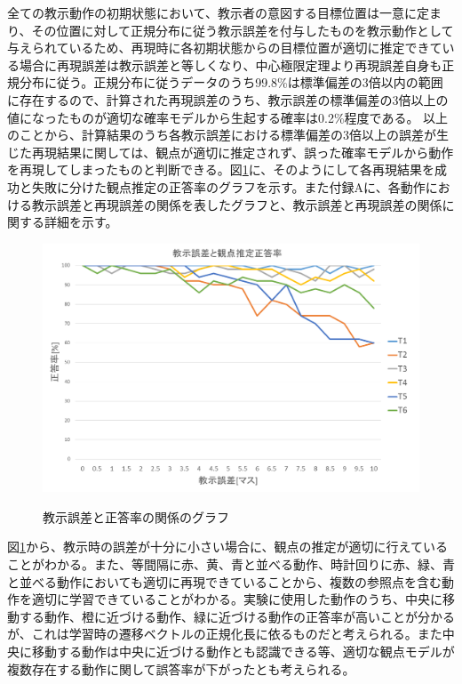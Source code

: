 全ての教示動作の初期状態において、教示者の意図する目標位置は一意に定まり、その位置に対して正規分布に従う教示誤差を付与したものを教示動作として与えられているため、再現時に各初期状態からの目標位置が適切に推定できている場合に再現誤差は教示誤差と等しくなり、中心極限定理より再現誤差自身も正規分布に従う。正規分布に従うデータのうち99.8\%は標準偏差の3倍以内の範囲に存在するので、計算された再現誤差のうち、教示誤差の標準偏差の3倍以上の値になったものが適切な確率モデルから生起する確率は0.2\%程度である。
以上のことから、計算結果のうち各教示誤差における標準偏差の3倍以上の誤差が生じた再現結果に関しては、観点が適切に推定されず、誤った確率モデルから動作を再現してしまったものと判断できる。図\ref{figure:success_rate}に、そのようにして各再現結果を成功と失敗に分けた観点推定の正答率のグラフを示す。また付録Aに、各動作における教示誤差と再現誤差の関係を表したグラフと、教示誤差と再現誤差の関係に関する詳細を示す。
	\begin{figure}[h]
		\begin{center}
			\includegraphics[width=14cm]{chart2.png} \\ %
			\caption{教示誤差と正答率の関係のグラフ}
			\label{figure:success_rate}
		\end{center}
	\end{figure}

図\ref{figure:success_rate}から、教示時の誤差が十分に小さい場合に、観点の推定が適切に行えていることがわかる。また、等間隔に赤、黄、青と並べる動作、時計回りに赤、緑、青と並べる動作においても適切に再現できていることから、複数の参照点を含む動作を適切に学習できていることがわかる。実験に使用した動作のうち、中央に移動する動作、橙に近づける動作、緑に近づける動作の正答率が高いことが分かるが、これは学習時の遷移ベクトルの正規化長に依るものだと考えられる。また中央に移動する動作は中央に近づける動作とも認識できる等、適切な観点モデルが複数存在する動作に関して誤答率が下がったとも考えられる。




